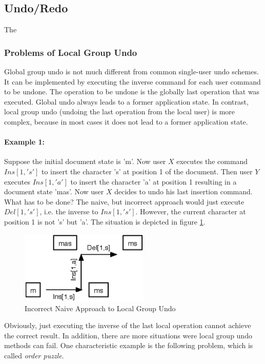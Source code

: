 \subsection{Undo/Redo}
The 

\subsubsection{Problems of Local Group Undo}
Global group undo is not much different from common single-user undo schemes. It can be implemented by executing the inverse command for each user command to be undone. The operation to be undone is the globally last operation that was executed. Global undo always leads to a former application state. In contrast, local group undo (undoing the last operation from the local user) is more complex, because in most cases it does not lead to a former application state.

\paragraph{Example 1:} Suppose the initial document state is 'm'. Now user $X$ executes the command $Ins[1,'s']$ to insert the character 's' at position 1 of the document. Then user $Y$ executes $Ins[1,'a']$ to insert the character 'a' at position 1 resulting in a document state 'mas'. Now user $X$ decides to undo his last insertion command. What has to be done? The naive, but incorrect approach would just execute $Del[1,'s']$, i.e. the inverse to $Ins[1,'s']$. However, the current character at position 1 is not 's' but 'a'. The situation is depicted in figure \ref{fig:concepts.naiveundo}.

\begin{figure}[htb]
 \centering
 \includegraphics[width=6.13cm,height=3.45cm]{../../images/concepts_naiveundo.eps}
 \caption{Incorrect Naive Approach to Local Group Undo}
 \label{fig:concepts.naiveundo}
\end{figure}

Obviously, just executing the inverse of the last local operation cannot achieve the correct result. In addition, there are more situations were local group undo methods can fail. One characteristic example is the following problem, which is called \emph{order puzzle}.

